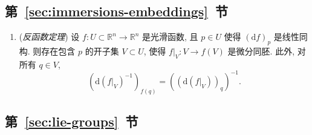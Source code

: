 \subsection[第 \ref{sec:immersions-embeddings} 节]{第~\ref{sec:immersions-embeddings}~节}\label{subsec:notes-inverse-function-theorem}

\begin{enumerate}[label=(\arabic*),leftmargin=*]
\item (\emph{反函数定理}) 设 $f:U\subset\mathbb{R}^n\to\mathbb{R}^n$ 是光滑函数, 且 $p\in U$ 使得 $(\mathrm{d}f)_p$ 是线性同构. 则存在包含 $p$ 的开子集 $V\subset U$, 使得 $f|_V:V\to f(V)$ 是微分同胚. 此外, 对所有 $q\in V$,
\[
  (\mathrm{d}(f|_V)^{-1})_{f(q)}=((\mathrm{d}(f|_V))_q)^{-1}.
\]
\end{enumerate}

\subsection[第 \ref{sec:lie-groups} 节]{第~\ref{sec:lie-groups}~节}\label{subsec:notes-proper-maps-and-fundamental-group}

